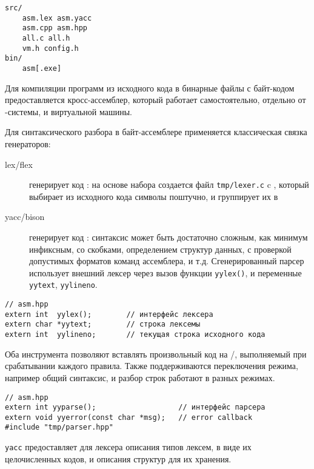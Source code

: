 \clearpage
{}\label{basm}\secdown

\begin{verbatim}
src/
    asm.lex asm.yacc
    asm.cpp asm.hpp
    all.c all.h
    vm.h config.h
bin/
    asm[.exe]
\end{verbatim}

\noindent
Для компиляции программ из исходного кода в бинарные файлы с байт-кодом
предоставляется кросс-ассемблер, который работает самостоятельно, отдельно от
\F-системы, и виртуальной машины.

\clearpage
{}

Для синтаксического разбора в байт-ассемблере применяется классическая связка генераторов:
\begin{description}
    \item[lex/flex] генерирует код : на основе набора
     создается файл \verb|tmp/lexer.c| c
    , который выбирает из исходного кода символы
    поштучно, и группирует их в 
    \item[yacc/bison] генерирует код : синтаксис может быть
    достаточно сложным, как минимум инфиксным, со скобками, определением
    структур данных, с проверкой допустимых форматов команд ассемблера, и т.д.
    Сгенерированный парсер использует внешний лексер через вызов функции
    \verb|yylex()|, и переменные \verb|yytext|, \verb|yylineno|.
\end{description}

\begin{verbatim}// asm.hpp
extern int  yylex();        // интерфейс лексера
extern char *yytext;        // строка лексемы
extern int  yylineno;       // текущая строка исходного кода
\end{verbatim}

Оба инструмента позволяют вставлять произвольный код на \ci/\cpp, выполняемый
при срабатывании каждого правила. Также поддерживаются переключения режима,
например общий синтаксис, и разбор строк работают в разных режимах.

\begin{verbatim}// asm.hpp
extern int yyparse();                   // интерфейс парсера
extern void yyerror(const char *msg);   // error callback
#include "tmp/parser.hpp"
\end{verbatim}

\verb|yacc| предоставляет для лексера описания типов лексем, в виде их
целочисленных кодов, и описания структур для их хранения.

